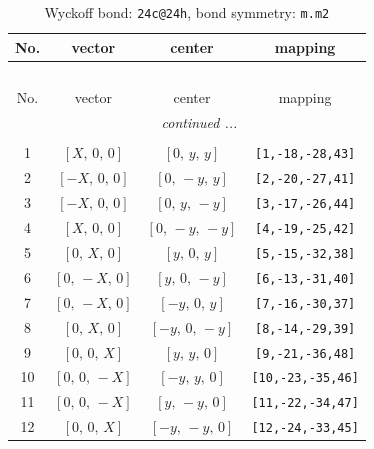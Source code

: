\documentclass[fleqn,8pt]{jsarticle}
\begin{document}
\begin{longtable}{cccc}
\caption{Wyckoff bond: {\tt 24c@24h}, bond symmetry: {\tt m.m2}}
 \\
 \hline \hline
No. & vector & center & mapping \\ \hline \endfirsthead

\multicolumn{3}{l}{\tablename\ \thetable{}} \\
 \hline \hline
No. & vector & center & mapping \\ \hline \endhead

 \hline \hline
\multicolumn{3}{r}{\footnotesize\it continued ...} \\ \endfoot

 \hline \hline
\multicolumn{3}{r}{} \\ \endlastfoot

1 & $\left[ X,\, 0,\, 0 \right]$ & $\left[ 0,\, y,\, y \right]$ & {\tt [1,-18,-28,43]} \\ \hline
2 & $\left[ - X,\, 0,\, 0 \right]$ & $\left[ 0,\, - y,\, y \right]$ & {\tt [2,-20,-27,41]} \\ \hline
3 & $\left[ - X,\, 0,\, 0 \right]$ & $\left[ 0,\, y,\, - y \right]$ & {\tt [3,-17,-26,44]} \\ \hline
4 & $\left[ X,\, 0,\, 0 \right]$ & $\left[ 0,\, - y,\, - y \right]$ & {\tt [4,-19,-25,42]} \\ \hline
5 & $\left[ 0,\, X,\, 0 \right]$ & $\left[ y,\, 0,\, y \right]$ & {\tt [5,-15,-32,38]} \\ \hline
6 & $\left[ 0,\, - X,\, 0 \right]$ & $\left[ y,\, 0,\, - y \right]$ & {\tt [6,-13,-31,40]} \\ \hline
7 & $\left[ 0,\, - X,\, 0 \right]$ & $\left[ - y,\, 0,\, y \right]$ & {\tt [7,-16,-30,37]} \\ \hline
8 & $\left[ 0,\, X,\, 0 \right]$ & $\left[ - y,\, 0,\, - y \right]$ & {\tt [8,-14,-29,39]} \\ \hline
9 & $\left[ 0,\, 0,\, X \right]$ & $\left[ y,\, y,\, 0 \right]$ & {\tt [9,-21,-36,48]} \\ \hline
10 & $\left[ 0,\, 0,\, - X \right]$ & $\left[ - y,\, y,\, 0 \right]$ & {\tt [10,-23,-35,46]} \\ \hline
11 & $\left[ 0,\, 0,\, - X \right]$ & $\left[ y,\, - y,\, 0 \right]$ & {\tt [11,-22,-34,47]} \\ \hline
12 & $\left[ 0,\, 0,\, X \right]$ & $\left[ - y,\, - y,\, 0 \right]$ & {\tt [12,-24,-33,45]} \\
\end{longtable}
\renewcommand{\arraystretch}{1.2}
\end{document}
